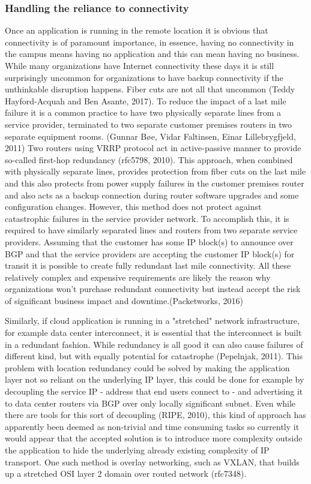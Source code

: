 \documentclass{article}
\begin{document}
\subsubsection{Handling the reliance to connectivity}
Once an application is running in the remote location it is obvious that connectivity is of paramount importance, in essence, having no connectivity in the campus means having no application and this can mean having no business. While many organizations have Internet connectivity these days it is still surprisingly uncommon for organizations to have backup connectivity if the unthinkable disruption happens. Fiber cuts are not all that uncommon (Teddy Hayford-Acquah and Ben Asante, 2017).
To reduce the impact of a last mile failure it is a common practice to have two physically separate lines from a service provider, terminated to two separate customer premises routers in two separate equipment rooms. (Gunnar Bøe, Vidar Faltinsen, Einar Lillebrygfjeld, 2011) Two routers using VRRP protocol act in active-passive manner to provide so-called first-hop redundancy (rfc5798, 2010). This approach, when combined with physically separate lines, provides protection from fiber cuts on the last mile and this also protects from power supply failures in the customer premises router and also acts as a backup connection during router software upgrades and some configuration changes.
However, this method does not protect against catastrophic failures in the service provider network. To accomplish this, it is required to have similarly separated lines and routers from two separate service providers. Assuming that the customer has some IP block(s) to announce over BGP and that the service providers are accepting the customer IP block(s) for transit it is possible to create fully redundant last mile connectivity. All these relatively complex and expensive requirements are likely the reason why organizations won't purchase redundant connectivity but instead accept the risk of significant business impact and downtime.(Packetworks, 2016)
\par
Similarly, if cloud application is running in a "stretched" network infrastructure, for example data center interconnect, it is essential that the interconnect is built in a redundant fashion. While redundancy is all good it can also cause failures of different kind, but with equally potential for catastrophe (Pepelnjak, 2011).
This problem with location redundancy could be solved by making the application layer not so reliant on the underlying IP layer, this could be done for example by decoupling the service IP - address that end users connect to - and advertising it to data center routers via BGP over only locally significant subnet. Even while there are tools for this sort of decoupling (RIPE, 2010), this kind of approach has apparently been deemed as non-trivial and time consuming tasks so currently it would appear that the accepted solution is to introduce more complexity outside the application to hide the underlying already existing complexity of IP transport. One such method is overlay networking, such as VXLAN, that builds up a stretched OSI layer 2 domain over routed network (rfc7348).
\end{document}

